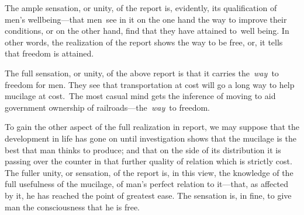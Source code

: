 \documentclass[twoside,symmetric,nobib,justified]{tufte-book}
\begin{document}
The ample sensation, or unity, of the report is, evidently, its
qualification of men's wellbeing---that men~see in it on the one hand
the way to improve their conditions, or on the other hand, find that
they have attained to~well being. In other words, the realization of the
report shows the way to be free, or, it tells that freedom is attained.~

The full sensation, or unity, of the above report is that it carries
the~\emph{way~}to freedom for men. They see that transportation at cost
will go a long way to help mucilage at cost.~The most casual mind gets
the inference of moving to aid government ownership of
railroads---the\emph{~way~}to freedom.~

To gain the other aspect of the full realization in report, we may
suppose that the development in life has gone on until investigation
shows that the mucilage is the best that man thinks to produce; and that
on the side of its distribution it is passing over the counter in that
further quality of relation which is strictly cost. The fuller unity, or
sensation, of the report is, in this view, the knowledge of the full
usefulness of the mucilage, of man's perfect relation to it---that, as
affected by it, he has reached the point of greatest ease. The sensation
is, in fine, to give man the consciousness that he is free.~
\end{document}
